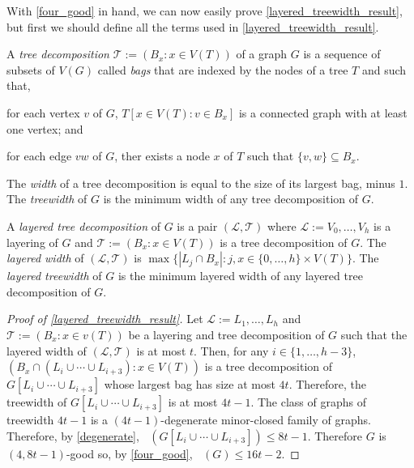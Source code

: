 \documentclass{patmorin}
\DeclareMathOperator{\odd}{\chi_o}
\begin{document}
With \cref{four_good} in hand, we can now easily prove \cref{layered_treewidth_result}, but first we should define all the terms used in \cref{layered_treewidth_result}.

A \emph{tree decomposition} $\mathcal{T}:=(B_x:x\in V(T))$ of a graph $G$ is a sequence of subsets of $V(G)$ called \emph{bags} that are indexed by the nodes of a tree $T$ and such that,
\begin{inparaenum}[(i)]
  \item for each vertex $v$ of $G$, $T[x\in V(T):v\in B_x]$ is a connected graph with at least one vertex; and
  \item for each edge $vw$ of $G$, ther exists a node $x$ of $T$ such that $\{v,w\}\subseteq B_x$.
\end{inparaenum}
The \emph{width} of a tree decomposition is equal to the size of its largest bag, minus $1$.  The \emph{treewidth} of $G$ is the minimum width of any tree decomposition of $G$.


A \emph{layered tree decomposition} of $G$ is a pair $(\mathcal{L},\mathcal{T})$ where $\mathcal{L}:=V_0,\ldots,V_h$ is a layering of $G$ and $\mathcal{T}:=(B_x:x\in V(T))$ is a tree decomposition of $G$.  The \emph{layered width} of $(\mathcal{L},\mathcal{T})$ is $\max\{|L_j\cap B_x|:j,x\in\{0,\ldots,h\}\times V(T)\}$.  The \emph{layered treewidth} of $G$ is the minimum layered width of any layered tree decomposition of $G$.

\begin{proof}[Proof of \cref{layered_treewidth_result}]
  Let $\mathcal{L}:=L_1,\ldots,L_h$ and $\mathcal{T}:=(B_x:x\in v(T))$ be a layering and tree decomposition of $G$ such that the layered width of $(\mathcal{L},\mathcal{T})$ is at most $t$.  Then, for any $i\in\{1,\ldots,h-3\}$, $(B_x\cap(L_i\cup\cdots\cup L_{i+3}):x\in V(T))$ is a tree decomposition of $G[L_i\cup\cdots\cup L_{i+3}]$ whose largest bag has size at most $4t$.  Therefore, the treewidth of $G[L_i\cup\cdots\cup L_{i+3}]$ is at most $4t-1$.  The class of graphs of treewidth $4t-1$ is a $(4t-1)$-degenerate minor-closed family of graphs.  Therefore, by \cref{degenerate}, $\odd(G[L_i\cup\cdots\cup L_{i+3}])\le 8t-1$.  Therefore $G$ is $(4,8t-1)$-good so, by \cref{four_good}, $\odd(G)\le 16t-2$.
\end{proof}
\end{document}
